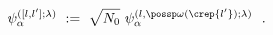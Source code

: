 \begin{equation}\label{cosetbcdef}
\psi _{\alpha }^{([l,l'];\lambda) }\ :=\ \sqrt{N_{0}}\ \psi _{\alpha
}^{(l,\possp \omega
(\crep{l'});\lambda )}\ \ .
\end{equation}

